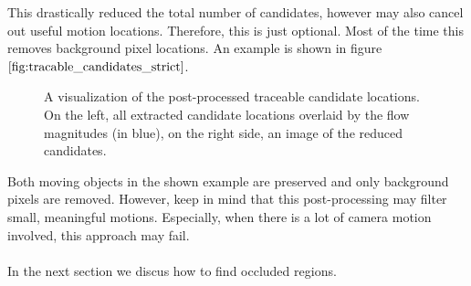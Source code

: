 This drastically reduced the total number of candidates, however may also cancel out useful motion locations. Therefore, this is just optional. Most of the time this removes background pixel locations. An example is shown in figure $\ref{fig:tracable_candidates_strict}$.
\begin{figure}[H]
\begin{center}
\end{center}
\caption[Strict Dense Candidates]{A visualization of the post-processed traceable candidate locations. On the left, all extracted candidate locations overlaid by the flow magnitudes (in blue), on the right side, an image of the reduced candidates.}
\label{fig:tracable_candidates_strict}
\end{figure}
Both moving objects in the shown example are preserved and only background pixels are removed. However, keep in mind that this post-processing may filter small, meaningful motions. Especially, when there is a lot of camera motion involved, this approach may fail. \\ \\
In the next section we discus how to find occluded regions.

